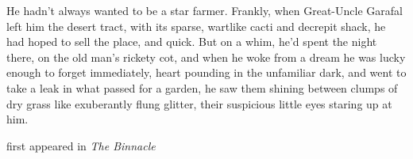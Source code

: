 
He hadn't always wanted to be a star farmer. Frankly, when Great-Uncle
Garafal left him the desert tract, with its sparse, wartlike cacti and
decrepit shack, he had hoped to sell the place, and quick. But on a
whim, he'd spent the night there, on the old man's rickety cot, and when
he woke from a dream he was lucky enough to forget immediately, heart
pounding in the unfamiliar dark, and went to take a leak in what passed
for a garden, he saw them shining between clumps of dry grass like
exuberantly flung glitter, their suspicious little eyes staring up at
him.

first appeared in \emph{The Binnacle}
